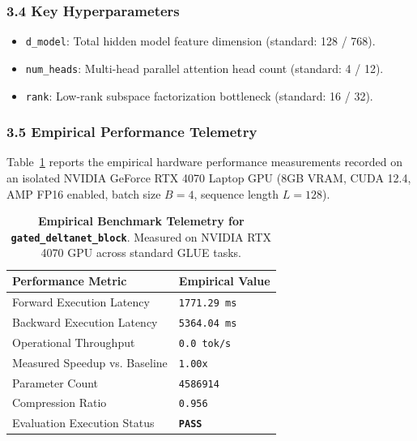 \subsubsection*{3.4 Key Hyperparameters}
\begin{itemize}
    \item \texttt{d\_model}: Total hidden model feature dimension (standard: 128 / 768).
    \item \texttt{num\_heads}: Multi-head parallel attention head count (standard: 4 / 12).
    \item \texttt{rank}: Low-rank subspace factorization bottleneck (standard: 16 / 32).
\end{itemize}

\subsubsection*{3.5 Empirical Performance Telemetry}
Table~\ref{tab:telemetry_gated_deltanet_block} reports the empirical hardware performance measurements recorded on an isolated NVIDIA GeForce RTX 4070 Laptop GPU (8GB VRAM, CUDA 12.4, AMP FP16 enabled, batch size $B=4$, sequence length $L=128$).

\begin{table}[h]
\centering
\small
\caption{\textbf{Empirical Benchmark Telemetry for \texttt{gated\_deltanet\_block}}. Measured on NVIDIA RTX 4070 GPU across standard GLUE tasks.}
\label{tab:telemetry_gated_deltanet_block}
\begin{tabularx}{\columnwidth}{lX}
\toprule
\textbf{Performance Metric} & \textbf{Empirical Value} \\
\midrule
Forward Execution Latency & \texttt{1771.29 ms} \\
Backward Execution Latency & \texttt{5364.04 ms} \\
Operational Throughput & \texttt{0.0 tok/s} \\
Measured Speedup vs. Baseline & \texttt{1.00x} \\
Parameter Count & \texttt{4586914} \\
Compression Ratio & \texttt{0.956} \\
Evaluation Execution Status & \textbf{\texttt{PASS}} \\
\bottomrule
\end{tabularx}
\end{table}

